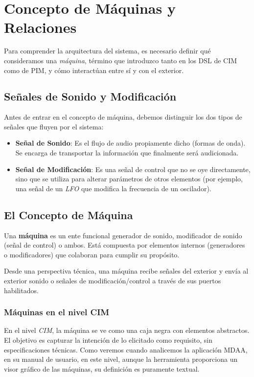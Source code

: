 \chapter{Concepto de Máquinas y Relaciones}

Para comprender la arquitectura del sistema, es necesario definir qué consideramos una \textit{máquina}, término que introduzco tanto en los DSL de CIM como de PIM, y cómo interactúan entre sí y con el exterior.

\section{Señales de Sonido y Modificación}

Antes de entrar en el concepto de máquina, debemos distinguir los dos tipos de señales que fluyen por el sistema:

\begin{itemize}
    \item \textbf{Señal de Sonido}: Es el flujo de audio propiamente dicho (formas de onda). Se encarga de transportar la información que finalmente será audicionada.
    \item \textbf{Señal de Modificación}: Es una señal de control que no se oye directamente, sino que se utiliza para alterar parámetros de otros elementos (por ejemplo, una señal de un \textit{LFO} que modifica la frecuencia de un oscilador).
\end{itemize}

\section{El Concepto de Máquina}

Una \textbf{máquina} es un ente funcional generador de sonido, modificador de sonido (señal de control) o ambos. Está compuesta por elementos internos (generadores o modificadores) que colaboran para cumplir su propósito. 

Desde una perspectiva técnica, una máquina recibe señales del exterior y envía al exterior sonido o señales de modificación/control a través de sus puertos habilitados.

\subsection{Máquinas en el nivel CIM}
En el nivel \textit{CIM}, la máquina se ve como una caja negra con elementos abstractos. El objetivo es capturar la intención de lo elicitado como requisito, sin especificaciones técnicas. Como veremos cuando analicemos la aplicación MDAA, en su manual de usuario, en este nivel, aunque la herramienta proporciona un visor gráfico de las máquinas, su definición es puramente textual.

